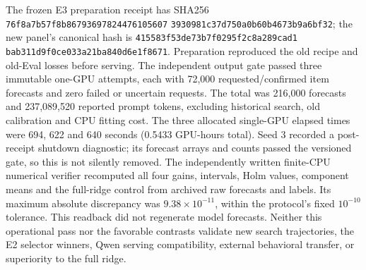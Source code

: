 The frozen E3 preparation receipt has SHA256
\texttt{76f8a7b57f8b86793697824476105607}\allowbreak
\texttt{3930981c37d750a0b60b4673b9a6bf32};
the new panel's canonical hash is
\texttt{415583f53de73b7f0295f2c8a289cad1}\allowbreak
\texttt{bab311d9f0ce033a21ba840d6e1f8671}.
Preparation reproduced the old recipe and old-Eval losses before serving.
The independent output gate passed three immutable one-GPU attempts, each
with 72,000 requested/confirmed item forecasts and zero failed or uncertain
requests. The total was 216,000 forecasts and 237,089,520 reported prompt
tokens, excluding historical search, old calibration and CPU fitting cost.
The three allocated single-GPU elapsed times were 694, 622 and 640 seconds
(0.5433 GPU-hours total). Seed 3 recorded a post-receipt shutdown diagnostic;
its forecast arrays and counts passed the versioned gate, so this is not
silently removed. The independently written finite-CPU numerical verifier
recomputed all four gains, intervals, Holm values, component means and the
full-ridge control from archived raw forecasts and labels. Its maximum
absolute discrepancy was $9.38\times10^{-11}$, within the protocol's fixed
$10^{-10}$ tolerance. This readback did not regenerate model forecasts.
Neither this operational pass nor the favorable contrasts validate new
search trajectories, the E2 selector winners, Qwen serving compatibility,
external behavioral transfer, or superiority to the full ridge.
